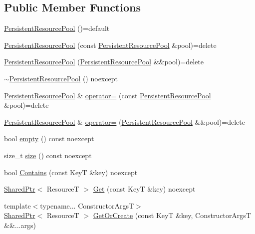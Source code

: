 \subsection*{Public Member Functions}
\begin{DoxyCompactItemize}
\item 
\hyperlink{classmage_1_1_persistent_resource_pool_a23b83adf594628b93c368a2da7660ef8}{Persistent\+Resource\+Pool} ()=default
\item 
\hyperlink{classmage_1_1_persistent_resource_pool_af49749cabca4e6e16b2c073f6f550e0b}{Persistent\+Resource\+Pool} (const \hyperlink{classmage_1_1_persistent_resource_pool}{Persistent\+Resource\+Pool} \&pool)=delete
\item 
\hyperlink{classmage_1_1_persistent_resource_pool_a74c46a17cc52d5570a3fd0b7a6bceb81}{Persistent\+Resource\+Pool} (\hyperlink{classmage_1_1_persistent_resource_pool}{Persistent\+Resource\+Pool} \&\&pool)=delete
\item 
\hyperlink{classmage_1_1_persistent_resource_pool_a13bb68c8a9f8c37f9f217aea2625935a}{$\sim$\+Persistent\+Resource\+Pool} () noexcept
\item 
\hyperlink{classmage_1_1_persistent_resource_pool}{Persistent\+Resource\+Pool} \& \hyperlink{classmage_1_1_persistent_resource_pool_a796e9dbb12e2756412c50117a6a67f86}{operator=} (const \hyperlink{classmage_1_1_persistent_resource_pool}{Persistent\+Resource\+Pool} \&pool)=delete
\item 
\hyperlink{classmage_1_1_persistent_resource_pool}{Persistent\+Resource\+Pool} \& \hyperlink{classmage_1_1_persistent_resource_pool_adcec8a286b15174ee99200b68ba0589e}{operator=} (\hyperlink{classmage_1_1_persistent_resource_pool}{Persistent\+Resource\+Pool} \&\&pool)=delete
\item 
bool \hyperlink{classmage_1_1_persistent_resource_pool_a9a5669551c15823b817b3c4716a5a52c}{empty} () const noexcept
\item 
size\+\_\+t \hyperlink{classmage_1_1_persistent_resource_pool_a97dee6f5087b59f3e5b4fe14dca74b40}{size} () const noexcept
\item 
bool \hyperlink{classmage_1_1_persistent_resource_pool_a92af0c4a200ea217b831d89cfc321557}{Contains} (const KeyT \&key) noexcept
\item 
\hyperlink{namespacemage_a1e01ae66713838a7a67d30e44c67703e}{Shared\+Ptr}$<$ ResourceT $>$ \hyperlink{classmage_1_1_persistent_resource_pool_ad8d5e096f7f9f0446993b83fe1767fd3}{Get} (const KeyT \&key) noexcept
\item 
{\footnotesize template$<$typename... Constructor\+ArgsT$>$ }\\\hyperlink{namespacemage_a1e01ae66713838a7a67d30e44c67703e}{Shared\+Ptr}$<$ ResourceT $>$ \hyperlink{classmage_1_1_persistent_resource_pool_a403e25004cfc740c9378c9ee846d8148}{Get\+Or\+Create} (const KeyT \&key, Constructor\+ArgsT \&\&...args)

\end{DoxyCompactItemize}
